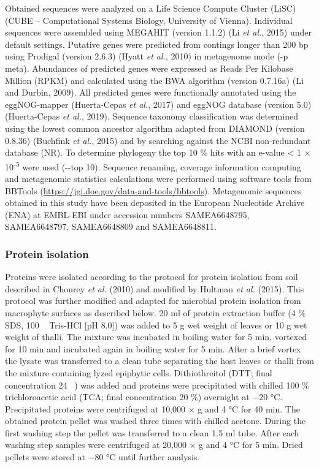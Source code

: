 \documentclass[12pt,]{article}
\begin{document}
Obtained sequences were analyzed on a Life Science Compute Cluster
(LiSC) (CUBE -- Computational Systems Biology, University of Vienna).
Individual sequences were assembled using MEGAHIT (version 1.1.2) (Li
\emph{et al.}, 2015) under default settings. Putative genes were
predicted from contings longer than 200 bp using Prodigal (version
2.6.3) (Hyatt \emph{et al.}, 2010) in metagenome mode (-p meta).
Abundances of predicted genes were expressed as Reads Per Kilobase
Million (RPKM) and calculated using the BWA algorithm (version 0.7.16a)
(Li and Durbin, 2009). All predicted genes were functionally annotated
using the eggNOG-mapper (Huerta-Cepas \emph{et al.}, 2017) and eggNOG
database (version 5.0) (Huerta-Cepas \emph{et al.}, 2019). Sequence
taxonomy classification was determined using the lowest common ancestor
algorithm adapted from DIAMOND (version 0.8.36) (Buchfink \emph{et al.},
2015) and by searching against the NCBI non-redundant database (NR). To
determine phylogeny the top 10 \si{\percent} hits with an e-value
\textless{} 1 × 10\textsuperscript{-5} were used (-\/-top 10). Sequence
renaming, coverage information computing and metagenomic statistics
calculations were performed using software tools from BBTools
(\url{https://jgi.doe.gov/data-and-tools/bbtools}). Metagenomic
sequences obtained in this study have been deposited in the European
Nucleotide Archive (ENA) at EMBL-EBI under accession numbers
SAMEA6648795, SAMEA6648797, SAMEA6648809 and SAMEA6648811.

\hypertarget{protein-isolation}{%
\subsubsection{Protein isolation}\label{protein-isolation}}

Proteins were isolated according to the protocol for protein isolation
from soil described in Chourey \emph{et al.} (2010) and modified by
Hultman \emph{et al.} (2015). This protocol was further modified and
adapted for microbial protein isolation from macrophyte surfaces as
described below. 20 \si{\ml} of protein extraction buffer (4
\si{\percent} SDS, 100 \si{\milli\Molar} Tris-HCl {[}pH 8.0{]}) was
added to 5 \si{\g} wet weight of leaves or 10 \si{\g} wet weight of
thalli. The mixture was incubated in boiling water for 5 \si{\minute},
vortexed for 10 \si{\minute} and incubated again in boiling water for 5
\si{\minute}. After a brief vortex the lysate was transferred to a clean
tube separating the host leaves or thalli from the mixture containing
lyzed epiphytic cells. Dithiothreitol (DTT; final concentration 24
\si{\milli\Molar}) was added and proteins were precipitated with chilled
100 \si{\percent} trichloroacetic acid (TCA; final concentration 20
\si{\percent}) overnight at \num{-20} °C. Precipitated proteins were
centrifuged at 10,000 × g and 4 \si{\degreeCelsius} for 40 \si{\minute}.
The obtained protein pellet was washed three times with chilled acetone.
During the first washing step the pellet was transferred to a clean 1.5
\si{\ml} tube. After each washing step samples were centrifuged at
20,000 × g and 4 \si{\degreeCelsius} for 5 \si{\minute}. Dried pellets
were stored at \num{-80} °C until further analysis.
\end{document}

